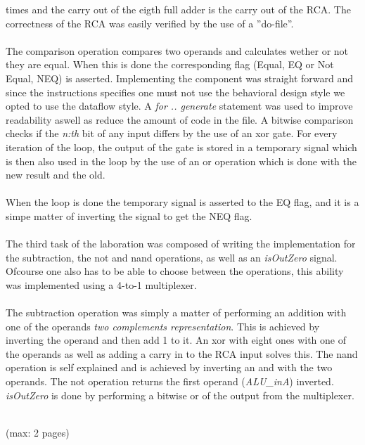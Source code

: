 \documentclass[a4paper,11pt]{article}
\begin{document}
times and the carry out of the eigth full adder is the carry out of the RCA. 
The correctness of the RCA was easily verified by the use of a ''do-file''.\\\\
\noindent
The comparison operation compares two operands and calculates wether or not 
they are equal. When this is done the corresponding flag (Equal, EQ or Not 
Equal, NEQ) is asserted. Implementing the component was straight forward and 
since the instructions specifies one must not use the behavioral design style 
we opted to use the dataflow style. A {\it for .. generate} statement was used 
to improve readability aswell as reduce the amount of code in the file. A 
bitwise comparison checks if the {\it n:th} bit of any input differs by the 
use of an xor gate. For every iteration of the loop, the output of the gate is 
stored in a temporary signal which is then also used in the loop by the use 
of an or operation which is done with the new result and the old.\\\\
\noindent
When the loop is done the temporary signal is asserted to the EQ flag, and it 
is a simpe matter of inverting the signal to get the NEQ flag.\\\\
\noindent
The third task of the laboration was composed of writing the implementation 
for the subtraction, the not and nand operations, as well as an {\it isOutZero} 
signal. Ofcourse one also has to be able to choose between the 
operations, this ability  was implemented using a 4-to-1 multiplexer.\\\\
\noindent
The subtraction operation was simply a matter of performing an addition with 
one of the operands {\it two complements representation}. This is achieved by 
inverting the operand and then add 1 to it. An xor with eight ones with one of 
the operands as well as adding a carry in to the RCA input solves this. The 
nand operation is self explained and is achieved by inverting an and with the 
two operands. The not operation returns the first operand ({\it ALU\_inA}) 
inverted. {\it isOutZero} is done by performing a bitwise or of the output 
from the multiplexer.\\\\
\noindent

(max: 2 pages)
\\\\
\end{document}
